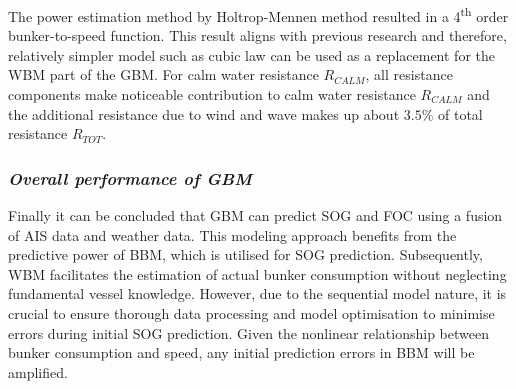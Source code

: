 The power estimation method by Holtrop-Mennen method resulted in a 4\textsuperscript{th} order bunker-to-speed function. This result aligns with previous research and therefore, relatively simpler model such as cubic law can be used as a replacement for the WBM part of the GBM. For calm water resistance $R_{CALM}$, all resistance components make noticeable contribution to calm water resistance $R_{CALM}$ and the additional resistance due to wind and wave makes up about $3.5\%$ of total resistance $R_{TOT}$.\\

\subsubsection*{\emph{Overall performance of GBM}}

Finally it can be concluded that GBM can predict SOG and FOC using a fusion of AIS data and weather data. This modeling approach benefits from the predictive power of BBM, which is utilised for SOG prediction. Subsequently, WBM facilitates the estimation of actual bunker consumption without neglecting fundamental vessel knowledge.  However, due to the sequential model nature, it is crucial to ensure thorough data processing and model optimisation to minimise errors during initial SOG prediction. Given the nonlinear relationship between bunker consumption and speed, any initial prediction errors in BBM will be amplified.\\














